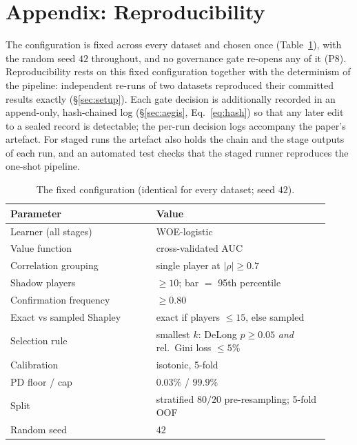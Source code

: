 \documentclass[9pt,journal]{IEEEtai}
\begin{document}
\section*{Appendix: Reproducibility}
The configuration is fixed across every dataset and chosen once (Table~\ref{tab:config}), with the
random seed $42$ throughout, and no governance gate re-opens any of it (P8). Reproducibility rests
on this fixed configuration together with the determinism of the pipeline: independent re-runs of
two datasets reproduced their committed results exactly (\S\ref{sec:setup}). Each gate decision is
additionally recorded in an append-only, hash-chained log (\S\ref{sec:aegis}, Eq.~\ref{eq:hash})
so that any later edit to a sealed record is detectable; the per-run decision logs accompany the
paper's artefact. For staged runs the artefact also holds the chain and the stage outputs of each run, and an
automated test checks that the staged runner reproduces the one-shot pipeline.

\begin{table}[!t]
\centering
\caption{The fixed configuration (identical for every dataset; seed $42$).}
\label{tab:config}
\footnotesize
\begin{tabular}{@{}p{0.42\linewidth}p{0.5\linewidth}@{}}
\toprule
Parameter & Value \\
\midrule
Learner (all stages) & WOE-logistic \\
Value function & cross-validated AUC \\
Correlation grouping & single player at $|\rho|\ge0.7$ \\
Shadow players & $\ge10$; bar $=$ 95th percentile \\
Confirmation frequency & $\ge0.80$ \\
Exact vs sampled Shapley & exact if players $\le15$, else sampled \\
Selection rule & smallest $k$: DeLong $p\ge0.05$ \emph{and} rel.\ Gini loss $\le5\%$ \\
Calibration & isotonic, 5-fold \\
PD floor / cap & $0.03\%$ / $99.9\%$ \\
Split & stratified $80/20$ pre-resampling; 5-fold OOF \\
Random seed & $42$ \\
\bottomrule
\end{tabular}
\end{table}



\end{document}
